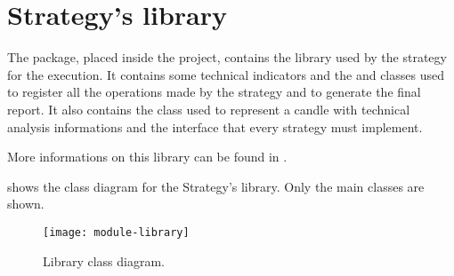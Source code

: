\section{Strategy's library}\label{sec:library}

The  package, placed inside the  project,
contains the library used by the strategy for the execution. It contains some
technical indicators and the  and  classes used to
register all the operations made by the strategy and to generate the final
report. It also contains the  class used to represent a candle with
technical analysis informations and the  interface that
every strategy must implement.

More informations on this library can be found in .

 shows the class diagram for the Strategy's library. Only
the main classes are shown.

\begin{figure}[htb]
	\texttt{[image: module-library]}
	\caption{Library class diagram.}\label{fig:library}
\end{figure}
